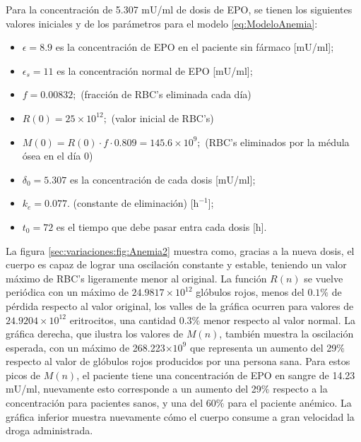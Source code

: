 Para la concentración de 5.307 mU/ml de dosis de EPO, se tienen los siguientes valores iniciales y de los parámetros para el modelo \ref{eq:ModeloAnemia}:

\begin{itemize}
    \item $\epsilon = 8.9$ es la concentración de EPO en el paciente sin fármaco [mU/ml];
    \item $\epsilon_s = 11$ es la concentración normal de EPO [mU/ml];
    \item $f=0.00832;$ (fracción de RBC's eliminada cada día)
    \item $R(0) = 25\times 10^{12};$ (valor inicial de RBC's)
    \item $M(0) = R(0)\cdot f \cdot 0.809 = 145.6\times 10^{9};$ (RBC's eliminados por la médula ósea en el día 0)
    \item $\delta_0=5.307$ es la concentración de cada dosis [mU/ml];
    \item $k_e=0.077.$ (constante de eliminación) [$\textrm{h}^{-1}$];
    \item $t_0=72$ es el tiempo que debe pasar entra cada dosis [h].
\end{itemize}

La figura \ref{sec:variaciones:fig:Anemia2} muestra como, gracias a la nueva dosis, el cuerpo es capaz de lograr una oscilación constante y estable, teniendo un valor máximo de RBC's ligeramente menor al original. La función $R(n)$ se vuelve periódica con un máximo de $24.9817\times 10^{12}$ glóbulos rojos, menos del $0.1\%$ de pérdida respecto al valor original, los valles de la gráfica ocurren para valores de $24.9204\times 10^{12}$ eritrocitos, una cantidad $0.3\%$ menor respecto al valor normal. La gráfica derecha, que ilustra los valores de $M(n)$, también muestra la oscilación esperada, con un máximo de 268.223$\times 10^{9}$ que representa un aumento del 29$\%$ respecto al valor de glóbulos rojos producidos por una persona sana. Para estos picos de $M(n)$, el paciente tiene una concentración de EPO en sangre de 14.23 mU/ml, nuevamente esto corresponde a un aumento del 29$\%$ respecto a la concentración para pacientes sanos, y una del 60$\%$ para el paciente anémico. La gráfica inferior muestra nuevamente cómo el cuerpo consume a gran velocidad la droga administrada. 

